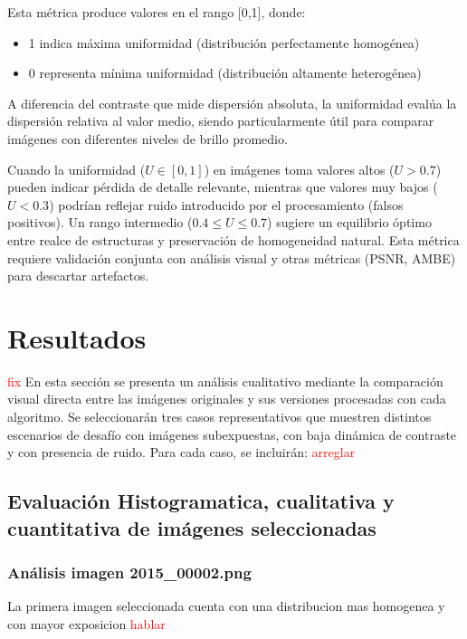 \documentclass[sigchi]{acmart}
\newcommand{\rojo}[1]{\textcolor{red}{#1}}
\begin{document}
Esta métrica produce valores en el rango [0,1], donde:
\begin{itemize}
	\item 1 indica máxima uniformidad (distribución perfectamente homogénea)
	\item 0 representa mínima uniformidad (distribución altamente heterogénea)
\end{itemize}

A diferencia del contraste que mide dispersión absoluta, la uniformidad evalúa la dispersión
relativa al valor medio, siendo particularmente útil para comparar imágenes con diferentes
niveles de brillo promedio.

Cuando la uniformidad ($U \in [0,1]$) en imágenes toma valores altos
($U > 0.7$) pueden indicar pérdida de detalle relevante, mientras que valores muy bajos ($U <
	0.3$) podrían reflejar ruido introducido por el procesamiento (falsos positivos). Un rango
intermedio ($0.4 \leq U \leq 0.7$) sugiere un equilibrio óptimo entre realce de estructuras y
preservación de homogeneidad natural. Esta métrica requiere validación conjunta con análisis
visual y otras métricas (PSNR, AMBE) para descartar artefactos.

\section{Resultados}
\label{sec:resultados}

\rojo{fix}
En esta sección se presenta un análisis cualitativo mediante la comparación visual directa
entre las imágenes originales y sus versiones procesadas con cada algoritmo. Se seleccionarán
tres casos representativos que muestren distintos escenarios de desafío con imágenes subexpuestas,
con baja dinámica de contraste y con presencia de ruido. Para cada caso, se incluirán:
\rojo{arreglar}

\subsection{Evaluación Histogramatica, cualitativa y cuantitativa de imágenes seleccionadas}

\subsubsection{Análisis imagen 2015\_00002.png}

La primera imagen seleccionada cuenta con una distribucion mas homogenea y con mayor exposicion
\rojo{hablar}
\end{document}
